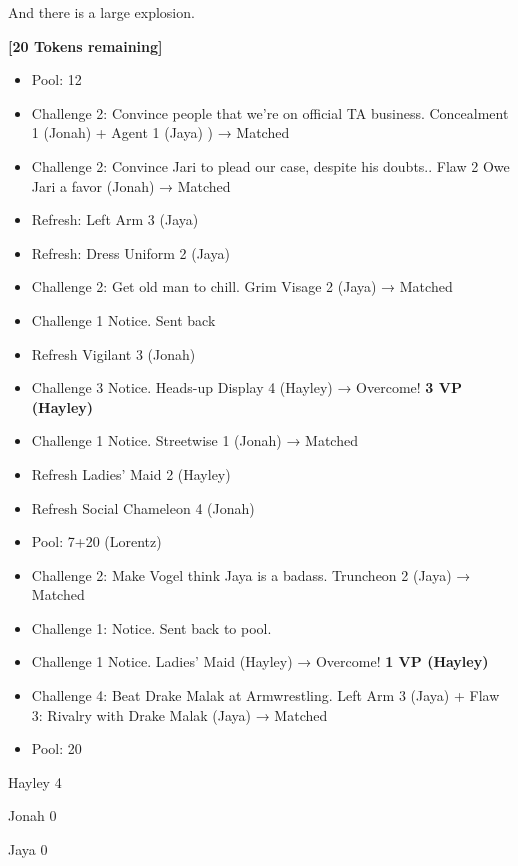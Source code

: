 And there is a large explosion.





\textbf{{[}20 Tokens remaining{]}}





\begin{itemize}
\item Pool: 12
\item Challenge 2: Convince people that we're on official TA business.  Concealment 1 (Jonah) + Agent 1 (Jaya) ) → Matched
\item Challenge 2: Convince Jari to plead our case, despite his doubts..  Flaw 2 Owe Jari a favor (Jonah) → Matched
\item Refresh: Left Arm 3 (Jaya)
\item Refresh: Dress Uniform 2 (Jaya)
\item Challenge 2: Get old man to chill.  Grim Visage 2 (Jaya) → Matched
\item Challenge 1 Notice. Sent back
\item Refresh Vigilant 3 (Jonah)
\item Challenge 3 Notice.  Heads-up Display 4 (Hayley) → Overcome! \textbf{3 VP (Hayley)}
\item Challenge 1 Notice.  Streetwise 1 (Jonah) → Matched
\item Refresh Ladies' Maid 2 (Hayley)
\item Refresh Social Chameleon 4 (Jonah)
\item Pool: 7+20 (Lorentz)
\item Challenge 2: Make Vogel think Jaya is a badass.  Truncheon 2 (Jaya) → Matched
\item Challenge 1: Notice.  Sent back to pool.
\item Challenge 1 Notice.  Ladies' Maid (Hayley) → Overcome! \textbf{1 VP (Hayley)}
\item Challenge 4: Beat Drake Malak at Armwrestling.  Left Arm 3 (Jaya) + Flaw 3: Rivalry with Drake Malak (Jaya) → Matched
\item Pool: 20
\end{itemize}





Hayley 4

Jonah 0

Jaya 0




